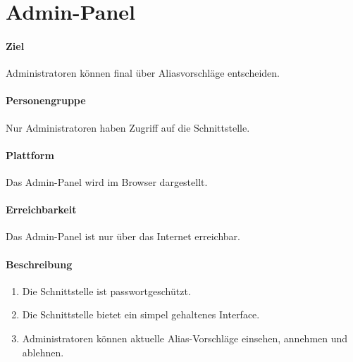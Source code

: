 \section{Admin-Panel}
\label{Admin-Panel}
\paragraph{Ziel}
Administratoren können final über Aliasvorschläge entscheiden.
\paragraph{Personengruppe}
Nur Administratoren haben Zugriff auf die Schnittstelle.
\paragraph{Plattform}
Das Admin-Panel wird im Browser dargestellt.
\paragraph{Erreichbarkeit}
Das Admin-Panel ist nur über das Internet erreichbar. 

\paragraph{Beschreibung}
\begin{enumerate}
    \item Die Schnittstelle ist passwortgeschützt.
    \item Die Schnittstelle bietet ein simpel gehaltenes Interface.
    \item Administratoren können aktuelle Alias-Vorschläge einsehen, annehmen und ablehnen.
\end{enumerate}